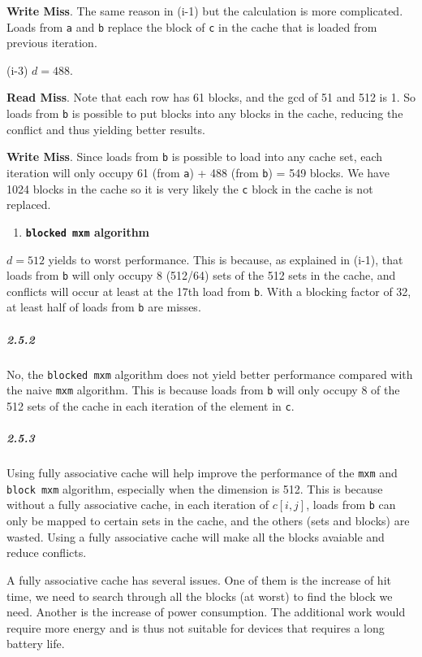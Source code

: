 \documentclass[11pt]{article}
\providecommand{\tightlist}{%
      \setlength{\itemsep}{0pt}\setlength{\parskip}{0pt}}
\begin{document}
\textbf{Write Miss}. The same reason in (i-1) but the calculation is
more complicated. Loads from \texttt{a} and \texttt{b} replace the block
of \texttt{c} in the cache that is loaded from previous iteration.

(i-3) \(d=488\).

\textbf{Read Miss}. Note that each row has 61 blocks, and the gcd of 51
and 512 is 1. So loads from \texttt{b} is possible to put blocks into
any blocks in the cache, reducing the conflict and thus yielding better
results.

\textbf{Write Miss}. Since loads from \texttt{b} is possible to load
into any cache set, each iteration will only occupy 61 (from \texttt{a})
+ 488 (from \texttt{b}) = 549 blocks. We have 1024 blocks in the cache
so it is very likely the \texttt{c} block in the cache is not replaced.

\begin{enumerate}
\def\labelenumi{(\roman{enumi})}
\setcounter{enumi}{1}
\tightlist
\item
  \textbf{\texttt{blocked\ mxm} algorithm}
\end{enumerate}

\(d=512\) yields to worst performance. This is because, as explained in
(i-1), that loads from \texttt{b} will only occupy 8 (512/64) sets of
the 512 sets in the cache, and conflicts will occur at least at the 17th
load from \texttt{b}. With a blocking factor of 32, at least half of
loads from \texttt{b} are misses.

    \subparagraph{2.5.2}\label{section}

No, the \texttt{blocked\ mxm} algorithm does not yield better
performance compared with the naive \texttt{mxm} algorithm. This is
because loads from \texttt{b} will only occupy 8 of the 512 sets of the
cache in each iteration of the element in \texttt{c}.

\subparagraph{2.5.3}\label{section-1}

Using fully associative cache will help improve the performance of the
\texttt{mxm} and \texttt{block\ mxm} algorithm, especially when the
dimension is 512. This is because without a fully associative cache, in
each iteration of \(c[i,j]\), loads from \texttt{b} can only be mapped
to certain sets in the cache, and the others (sets and blocks) are
wasted. Using a fully associative cache will make all the blocks
avaiable and reduce conflicts.

A fully associative cache has several issues. One of them is the
increase of hit time, we need to search through all the blocks (at
worst) to find the block we need. Another is the increase of power
consumption. The additional work would require more energy and is thus
not suitable for devices that requires a long battery life.
\end{document}
